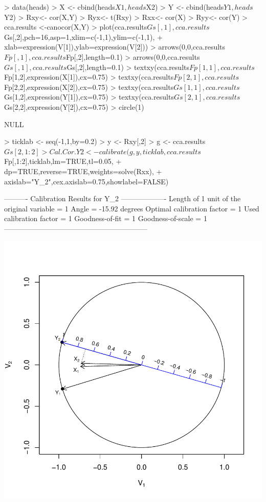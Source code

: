 \documentclass[a4paper]{article}
\begin{document}
\begin{Schunk}
\begin{Sinput}
> data(heads)
> X  <- cbind(heads$X1,heads$X2)
> Y  <- cbind(heads$Y1,heads$Y2)
> Rxy<- cor(X,Y)
> Ryx<- t(Rxy)
> Rxx<- cor(X)
> Ryy<- cor(Y)
> cca.results <-canocor(X,Y)
> plot(cca.results$Gs[,1],cca.results$Gs[,2],pch=16,asp=1,xlim=c(-1,1),ylim=c(-1,1),
+      xlab=expression(V[1]),ylab=expression(V[2]))
> arrows(0,0,cca.results$Fp[,1],cca.results$Fp[,2],length=0.1)
> arrows(0,0,cca.results$Gs[,1],cca.results$Gs[,2],length=0.1)
> textxy(cca.results$Fp[1,1],cca.results$Fp[1,2],expression(X[1]),cx=0.75)
> textxy(cca.results$Fp[2,1],cca.results$Fp[2,2],expression(X[2]),cx=0.75)
> textxy(cca.results$Gs[1,1],cca.results$Gs[1,2],expression(Y[1]),cx=0.75)
> textxy(cca.results$Gs[2,1],cca.results$Gs[2,2],expression(Y[2]),cx=0.75)
> circle(1)
\end{Sinput}
\begin{Soutput}
NULL
\end{Soutput}
\begin{Sinput}
> ticklab  <- seq(-1,1,by=0.2)  
> y <- Rxy[,2]
> g <- cca.results$Gs[2,1:2]                        
> Cal.Cor.Y2 <- calibrate(g,y,ticklab,cca.results$Fp[,1:2],ticklab,lm=TRUE,tl=0.05,
+                         dp=TRUE,reverse=TRUE,weights=solve(Rxx),
+ axislab="Y_2",cex.axislab=0.75,showlabel=FALSE)
\end{Sinput}
\begin{Soutput}
---------- Calibration Results for  Y_2  -------------------
Length of 1 unit of the original variable =  1  
Angle                                     =  -15.92 degrees
Optimal calibration factor                =  1  
Used calibration factor                   =  1  
Goodness-of-fit                           =  1  
Goodness-of-scale                         =  1  
------------------------------------------------------------
\end{Soutput}
\end{Schunk}
\includegraphics{CalibrationGuide-015}
\end{document}
